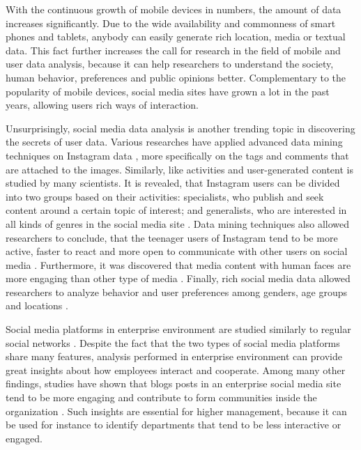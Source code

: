    With the continuous growth of mobile devices in numbers, the amount of data increases significantly. Due to the wide availability and commonness of smart phones and tablets, anybody can easily generate rich location, media or textual data. This fact further increases the call for research in the field of mobile and user data analysis, because it can help researchers to understand the society, human behavior, preferences and public opinions better. Complementary to the popularity of mobile devices, social media sites have grown a lot in the past years, allowing users rich ways of interaction.  

    Unsurprisingly, social media data analysis is another trending topic in discovering the secrets of user data. Various researches have applied advanced data mining techniques on Instagram data \cite{jang2015noreciprocity, bakhshi2014faces, hu2014we, jang2016teensengagemorewithfewerphotos, han2016teensarefrommars}, more specifically on the tags and comments that are attached to the images. Similarly, like activities and user-generated content is studied by many scientists. It is revealed, that Instagram users can be divided into two groups based on their activities: specialists, who publish and seek content around a certain topic of interest; and generalists, who are interested in all kinds of genres in the social media site \cite{jang2015noreciprocity}. Data mining techniques also allowed researchers to conclude, that the teenager users of Instagram tend to be more active, faster to react and more open to communicate with other users on social media \cite{jang2016teensengagemorewithfewerphotos, han2016teensarefrommars}. Furthermore, it was discovered that media content with human faces are more engaging than other type of media \cite{bakhshi2014faces}. Finally, rich social media data allowed researchers to analyze behavior and user preferences among genders, age groups and locations \cite{farseev2015harvestingmultiplesources}.

    Social media platforms in enterprise environment are studied similarly to regular social networks \cite{guy2016whatsyourorganizationlike}. Despite the fact that the two types of social media platforms share many features, analysis performed in enterprise environment can provide great insights about how employees interact and cooperate. Among many other findings, studies have shown that blogs posts in an enterprise social media site tend to be more engaging and contribute to form communities inside the organization \cite{guy2016whatsyourorganizationlike}. Such insights are essential for higher management, because it can be used for instance to identify departments that tend to be less interactive or engaged.  

